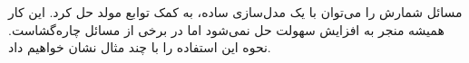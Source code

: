 \p
مسائل شمارش را می‌توان با یک مدل‌سازی ساده، به کمک توابع مولد حل کرد.
این کار همیشه منجر به افزایش سهولت حل نمی‌شود اما در برخی از مسائل چاره‌گشاست.
نحوه این استفاده را با چند مثال نشان خواهیم داد.



